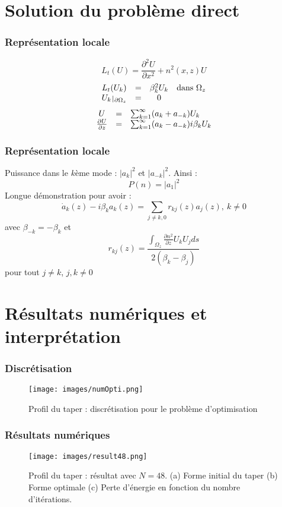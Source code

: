 \documentclass[handout]{beamer}
\def\restriction#1#2{\mathchoice
              {\setbox1\hbox{${\displaystyle #1}_{\scriptstyle #2}$}
              \restrictionaux{#1}{#2}}
              {\setbox1\hbox{${\textstyle #1}_{\scriptstyle #2}$}
              \restrictionaux{#1}{#2}}
              {\setbox1\hbox{${\scriptstyle #1}_{\scriptscriptstyle #2}$}
              \restrictionaux{#1}{#2}}
              {\setbox1\hbox{${\scriptscriptstyle #1}_{\scriptscriptstyle #2}$}
              \restrictionaux{#1}{#2}}}
\def\restrictionaux#1#2{{#1\,\smash{\vrule height .8\ht1 depth .85\dp1}}_{\,#2}}
\begin{document}
\section{Solution du problème direct}
\begin{frame}
	\frametitle{Représentation locale}
\[L_t(U)=\frac{\partial^2U}{\partial x^2}+n^2(x,z)U\]
\begin{equation} \label{eq13}
	\begin{array}{c c c c}
		L_t(U_k)&=&\beta_k^2U_k &\text{dans } \Omega_z\\
		\restriction{U_k}{\partial\Omega_z}&=&0
	\end{array}
\end{equation}
\begin{equation}\label{eq14}
\begin{array}{c c l}
U&=&\sum_{k=1}^\infty (a_k+a_{-k})U_k\\
\frac{\partial U}{\partial z}&=&\sum_{k=1}^\infty (a_k-a_{-k})i\beta_kU_k
\end{array}
\end{equation}
\end{frame}

\begin{frame}
	\frametitle{Représentation locale}
Puissance dans le $k$ème mode : $|a_k|^2$ et $|a_{-k}|^2$. Ainsi :
\[P(n)=|a_1|^2\]
Longue démonstration pour avoir :
\begin{equation} \label{eq17}
\dot{a}_k(z)-i\beta_ka_k(z)=\sum_{j\neq k,0} r_{kj}(z)a_j(z),\ k\neq 0
\end{equation}
avec $\beta_{-k}=-\beta_k$ et \[r_{kj}(z)=\frac{\int_{\Omega_z} \frac{\partial n^2}{\partial z} U_kU_j ds}{2(\beta_k-\beta_j)}\]
pour tout $j\neq k$, $j,k\neq 0$\\
\end{frame}

\section{Résultats numériques et interprétation}
\begin{frame}
	\frametitle{Discrétisation}
\begin{figure}[!h]
	\centering
	\texttt{[image: images/numOpti.png]}
	\caption{Profil du taper : discrétisation pour le problème d'optimisation}
	\label{fig:numOpti}
\end{figure}
\end{frame}

\begin{frame}
	\frametitle{Résultats numériques}
\begin{figure}[!h]
	\centering
	\texttt{[image: images/result48.png]}
	\caption{Profil du taper : résultat avec $N=48$. (a) Forme initial du taper (b) Forme optimale (c) Perte d'énergie en fonction du nombre d'itérations.}
	\label{fig:result48}
\end{figure}
\end{frame}
\end{document}
